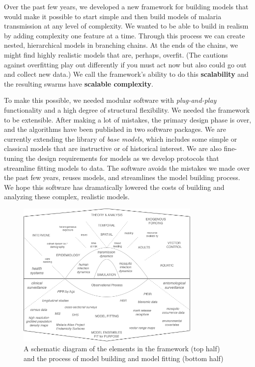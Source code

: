 \documentclass[
]{book}
\begin{document}
Over the past few years, we developed a new framework for building models that would make it possible to start simple and then build models of malaria transmission at any level of complexity. We wanted to be able to build in realism by adding complexity one feature at a time. Through this process we can create nested, hierarchical models in branching chains. At the ends of the chains, we might find highly realistic models that are, perhaps, overfit. (The cautions against overfitting play out differently if you must act now but also could go out and collect new data.) We call the framework's ability to do this \textbf{scalability} and the resulting swarms have \textbf{scalable complexity}.

To make this possible, we needed modular software with \emph{plug-and-play} functionality and a high degree of structural flexibility. We needed the framework to be extensible. After making a lot of mistakes, the primary design phase is over, and the algorithms have been published in two software packages. We are currently extending the library of \emph{base models}, which includes some simple or classical models that are instructive or of historical interest. We are also fine-tuning the design requirements for models as we develop protocols that streamline fitting models to data. The software avoids the mistakes we made over the past few years, reuses models, and streamlines the model building process. We hope this software has dramatically lowered the costs of building and analyzing these complex, realistic models.

\begin{figure}
\centering
\includegraphics[width=0.8\textwidth,height=\textheight]{../Figures/ScalableComplexity.png}
\caption{A schematic diagram of the elements in the framework (top half) and the process of model building and model fitting (bottom half)}
\end{figure}
\end{document}
